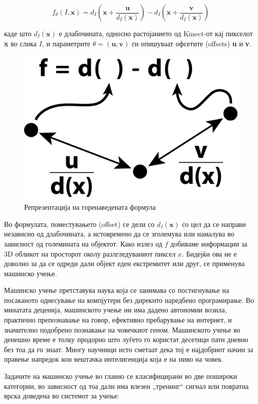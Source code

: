 \documentclass[12pt]{article}
\begin{document}
  \begin{equation}
	  f_\theta(I,\textbf{x}) = d_I(\textbf{x}+\frac{\textbf{u}}{d_I(\textbf{x})}) - d_I(\textbf{x}+\frac{\textbf{v}}{d_I(\textbf{x})})
    \end{equation}

  каде што $d_I(\textbf{x})$ е длабочината, односно растојанието од Kinect-от кај пикселот \textbf{x} во слика $I$, и параметрите $\theta = (\textbf{u},\textbf{v})$ ги опишуваат офсетите (offsets) \textbf{u} и \textbf{v}.

  \begin{figure}[H]
	  \includegraphics[width=0.35\linewidth]{./images/kinectfeature.png}
		\centering
		\caption{Репрезентација на горенаведената формула}
		\label{fig:kinectfeature.png}
	  \end{figure}

	Во формулата, поместувањето (offset) се дели со $d_I(\textbf{x})$ со цел да се направи независно од длабочината, а истовремено да се зголемува или намалува во зависност од големината на објектот. Како излез од $f$ добиваме информации за 3D обликот на просторот околу разлгледуваниот пиксел $x$. Бидејќи ова не е доволно за да се одреди дали објект еден екстремитет или друг, се применува машинско учење.

	Машинско учење претставува наука која се занимава со постигнување на посаканото однесување на компјутери без дирекнто наредбено програмирање. Во минатата деценија, машинското учење ни има дадено автономни возила, практично препознавање на говор, ефективно пребарување на интернет, и значително подобрено познавање на човечкиот геном. Машинското учење во денешно време е толку продорно што луѓето го користат десетици пати дневно без тоа да го знаат. Многу научници исто сметаат дека тој е најдобриот начин за правење напредок кон вештачка интелигенција која е на ниво на човек.

	Задачите на машинско учење во главно се класифицирани во две пошироки категории, во зависност од тоа дали има влезен „тренинг“ сигнал или повратна врска доведена во системот за учење:
\end{document}
